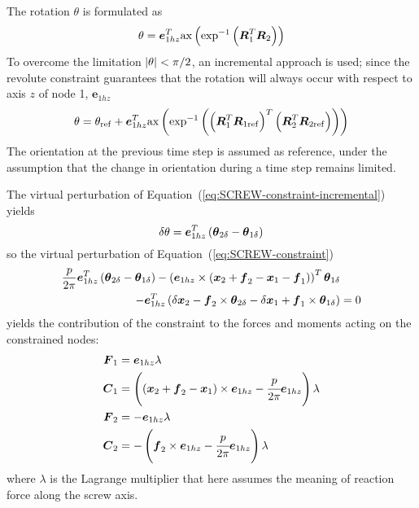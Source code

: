 \documentclass[10pt,dvips]{report}
\newcommand{\T}[1]{\boldsymbol{#1}}
\begin{document}
The rotation $\theta$ is formulated as
\begin{equation*}
	\theta = \T{e}_{1hz}^T \llk{ax}\plbr{\llk{exp}^{-1}\plbr{\T{R}_1^T \T{R}_2}}
\end{equation*}
To overcome the limitation $\left| \theta \right|<\pi/2$, an incremental
approach is used; since the revolute constraint guarantees that
the rotation will always occur with respect to axis $z$ of node 1,
$\T{e}_{1hz}$
\begin{equation}
	\label{eq:SCREW-constraint-incremental}
	\theta = \theta_{\llk{ref}}
		+ \T{e}_{1hz}^T \llk{ax}\plbr{\llk{exp}^{-1}\plbr{\plbr{\T{R}_1^T \T{R}_{1\llk{ref}}}^T \plbr{\T{R}_2^T \T{R}_{2\llk{ref}}}}}
\end{equation}
The orientation at the previous time step is assumed as reference,
under the assumption that the change in orientation during a time step 
remains limited.

The virtual perturbation of Equation~(\ref{eq:SCREW-constraint-incremental})
yields
\begin{equation*}
	\delta\theta = \T{e}_{1hz}^T\plbr{\T{\theta}_{2\delta} - \T{\theta}_{1\delta}}
\end{equation*}
so the virtual perturbation of Equation~(\ref{eq:SCREW-constraint})
\begin{align*}
	\frac{p}{2 \pi} \T{e}_{1hz}^T\plbr{\T{\theta}_{2\delta} - \T{\theta}_{1\delta}}
	- \plbr{\T{e}_{1hz} \times \plbr{\T{x}_2 + \T{f}_2 - \T{x}_1 - \T{f}_1}}^T \T{\theta}_{1\delta} & \\
	- \T{e}_{1hz}^T\plbr{\delta\T{x}_2 - \T{f}_2 \times \T{\theta}_{2\delta} - \delta\T{x}_1 + \T{f}_1 \times \T{\theta}_{1\delta}} &= 0
\end{align*}
yields the contribution of the constraint to the forces and moments
acting on the constrained nodes:
\begin{align*}
	\T{F}_1 &= \T{e}_{1hz} \lambda \\
	\T{C}_1 &= \plbr{
		\plbr{\T{x}_2 + \T{f}_2 - \T{x}_1} \times \T{e}_{1hz} 
		- \cfrac{p}{2 \pi} \T{e}_{1hz}
	} \lambda \\
	\T{F}_2 &= - \T{e}_{1hz} \lambda \\
	\T{C}_2 &= - \plbr{
		\T{f}_2 \times \T{e}_{1hz}
		- \cfrac{p}{2 \pi} \T{e}_{1hz}
	} \lambda
\end{align*}
where $\lambda$ is the Lagrange multiplier that here assumes the meaning
of reaction force along the screw axis.
\end{document}

